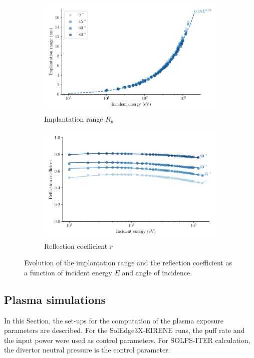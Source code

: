 \begin{figure}[h]
    \centering
    \begin{subfigure}{0.5\linewidth}
        \includegraphics[width=\linewidth]{Figures/divertor/implantation_range.pdf}
        \caption{Implantation range $R_p$}
        \label{fig: implantation range vs energy}
    \end{subfigure}%
    \begin{subfigure}{0.5\linewidth}                          
        \includegraphics[width=\linewidth]{Figures/divertor/reflection_coeff.pdf}
        \caption{Reflection coefficient $r$}
        \label{fig: reflection coeff vs energy}
    \end{subfigure}
    \caption{Evolution of the implantation range and the reflection coefficient as a function of incident energy $E$ and angle of incidence.}
\end{figure}

\subsection{Plasma simulations}
In this Section, the set-ups for the computation of the plasma exposure parameters are described.
For the SolEdge3X-EIRENE runs, the puff rate and the input power were used as control parameters.
For SOLPS-ITER calculation, the divertor neutral pressure is the control parameter.
